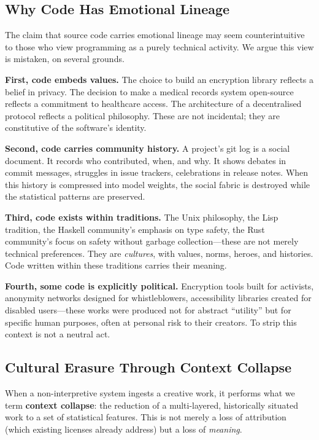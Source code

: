 \documentclass[11pt,twocolumn]{article}
\begin{document}
\subsection{Why Code Has Emotional Lineage}

The claim that source code carries emotional lineage may seem
counterintuitive to those who view programming as a purely technical
activity. We argue this view is mistaken, on several grounds.

\textbf{First, code embeds values.} The choice to build an encryption
library reflects a belief in privacy. The decision to make a medical
records system open-source reflects a commitment to healthcare access.
The architecture of a decentralised protocol reflects a political
philosophy. These are not incidental; they are constitutive of the
software's identity.

\textbf{Second, code carries community history.} A project's git log is
a social document. It records who contributed, when, and why. It shows
debates in commit messages, struggles in issue trackers, celebrations in
release notes. When this history is compressed into model weights, the
social fabric is destroyed while the statistical patterns are preserved.

\textbf{Third, code exists within traditions.} The Unix philosophy, the
Lisp tradition, the Haskell community's emphasis on type safety, the
Rust community's focus on safety without garbage collection---these are
not merely technical preferences. They are \emph{cultures}, with values,
norms, heroes, and histories. Code written within these traditions
carries their meaning.

\textbf{Fourth, some code is explicitly political.} Encryption tools
built for activists, anonymity networks designed for whistleblowers,
accessibility libraries created for disabled users---these works were
produced not for abstract ``utility'' but for specific human purposes,
often at personal risk to their creators. To strip this context is not
a neutral act.

\subsection{Cultural Erasure Through Context Collapse}

When a non-interpretive system ingests a creative work, it performs what
we term \textbf{context collapse}: the reduction of a multi-layered,
historically situated work to a set of statistical features. This is not
merely a loss of attribution (which existing licenses already address)
but a loss of \emph{meaning}.
\end{document}
